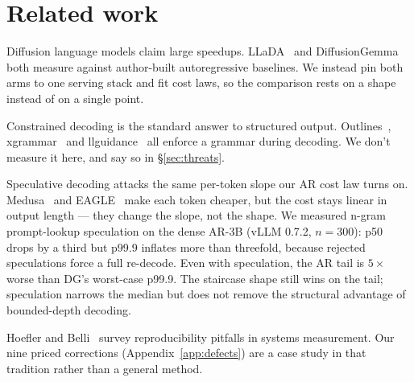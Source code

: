 \section{Related work}
\label{sec:related}

Diffusion language models claim large speedups. LLaDA~\cite{llada2025}
and DiffusionGemma~\cite{diffusiongemma} both measure against
author-built autoregressive baselines. We instead pin both arms to one
serving stack and fit cost laws, so the comparison rests on a shape
instead of on a single point.

Constrained decoding is the standard answer to structured
output. Outlines~\cite{outlines2024}, xgrammar~\cite{xgrammar2024} and
llguidance~\cite{llguidance} all enforce a grammar during decoding. We
don't measure it here, and say so in \S\ref{sec:threats}.

Speculative decoding attacks the same per-token slope our AR cost law
turns on. Medusa~\cite{medusa2024} and EAGLE~\cite{eagle2024} make each
token cheaper, but the cost stays linear in output length --- they
change the slope, not the shape. We measured n-gram prompt-lookup
speculation on the dense AR-3B (vLLM 0.7.2, $n{=}300$):
p50 drops by a third but p99.9 inflates more than threefold,
because rejected speculations force a full re-decode. Even with
speculation, the AR tail is $5\times$ worse than DG's worst-case p99.9.
The staircase shape still wins on the tail; speculation narrows the median
but does not remove the structural advantage of bounded-depth decoding.

Hoefler and Belli~\cite{hoefler2021} survey reproducibility pitfalls in
systems measurement. Our nine priced corrections
(Appendix~\ref{app:defects}) are a case study in that tradition rather
than a general method.

